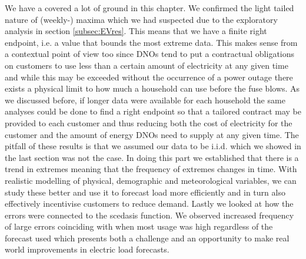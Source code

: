 We have a covered a lot of ground in this chapter. We confirmed the light tailed nature of (weekly-) maxima which we had suspected due to the exploratory analysis in section \ref{subsec:EVres}. This means that we have a finite right endpoint, i.e. a value that bounds the most extreme data. This makes sense from a contextual point of view too since DNOs tend to put a contractual obligations on customers to use less than a certain amount of electricity at any given time and while this may be exceeded without the occurrence of a power outage there exists a physical limit to how much a household can use before the fuse blows. As we discussed before, if longer data were available for each household the same analyses could be done to find a right endpoint so that a tailored contract may be provided to each customer and thus reducing both the cost of electricity for the customer and the amount of energy DNOs need to supply at any given time. The pitfall of these results is that we assumed our data to be i.i.d. which we showed in the last section was not the case. In doing this part we established that there is a trend in extremes meaning that the frequency of extremes changes in time. With realistic modelling of physical, demographic and meteorological variables, we can study these better and use it to forecast load more efficiently and in turn also effectively incentivise customers to reduce demand. Lastly we looked at how the errors were connected to the scedasis function. We observed increased frequency of large errors coinciding with when most usage was high regardless of the forecast used which presents both a challenge and an opportunity to make real  world improvements in electric load forecasts.



